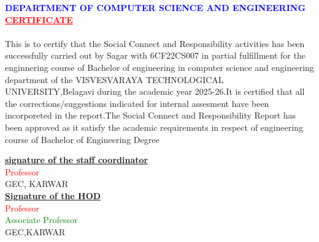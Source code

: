 \documentclass[a4paper,15pt]{article}
\begin{document}
\textcolor{blue}{\textbf{DEPARTMENT OF COMPUTER SCIENCE AND
ENGINEERING}}\\
\vspace{5mm}
\centering
\vspace{5mm}
\textcolor{red}{\underline{\textbf{CERTIFICATE}}}\\
\paragraph{}
This is to certify that the Social Connect and Responsibility activities has been
successfully carried out by Sagar with 6CF22CS007 in partial fulfillment for the
enginnering course of Bachelor of engineering in computer science and engineering
department of the VISVESVARAYA TECHNOLOGICAL UNIVERSITY,Belagavi during the
academic year 2025-26.It is certified that all the corrections/suggestions indicated
for internal assesment have been incorporeted in the report.The Social Connect and
Responsibility Report has been approved as it satisfy the academic requirements in
respect of engineering course of Bachelor of Engineering Degree
\begin{center}
\centering
\vspace{5mm}
\underline{\textbf{signature of the staff coordinator}}\\
\vspace{10mm}
\textcolor{red}{Professor}\\
GEC, KARWAR\\
\vspace{12mm}
\centering
\underline{\textbf{Signature of the HOD}}\\
\vspace{10mm}
\textcolor{red}{Professor}\\
\textcolor{green}{Associate Professor}\\
GEC,KARWAR
\end{center}
\end{document}
